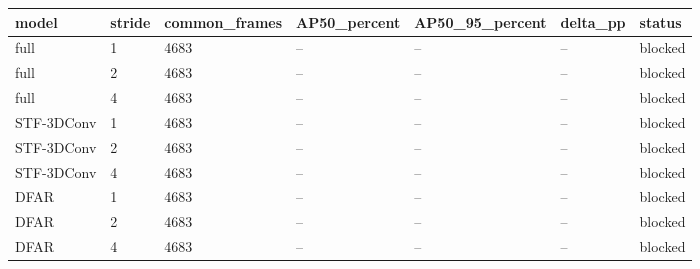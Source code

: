 \begin{tabular}{lllllll}
\hline
model & stride & common\_frames & AP50\_percent & AP50\_95\_percent & delta\_pp & status \\
\hline
full & 1 & 4683 & -- & -- & -- & blocked \\
full & 2 & 4683 & -- & -- & -- & blocked \\
full & 4 & 4683 & -- & -- & -- & blocked \\
STF-3DConv & 1 & 4683 & -- & -- & -- & blocked \\
STF-3DConv & 2 & 4683 & -- & -- & -- & blocked \\
STF-3DConv & 4 & 4683 & -- & -- & -- & blocked \\
DFAR & 1 & 4683 & -- & -- & -- & blocked \\
DFAR & 2 & 4683 & -- & -- & -- & blocked \\
DFAR & 4 & 4683 & -- & -- & -- & blocked \\
\hline
\end{tabular}
